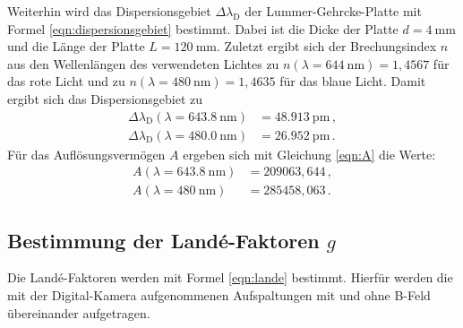 	Weiterhin wird das Dispersionsgebiet $\Delta \lambda_{\mathrm{D}}$ der
	Lummer-Gehrcke-Platte mit Formel
	\eqref{eqn:dispersionsgebiet} bestimmt. Dabei ist die Dicke der Platte $d=\SI{4}{\milli\meter}$
	und die Länge der Platte  $L = \SI{120}{\milli\meter}$. Zuletzt ergibt sich der
	Brechungsindex $n$ aus den Wellenlängen des verwendeten Lichtes zu
	$n(\lambda=\SI{644}{\nano\meter}) = 1,4567$ für das rote Licht und zu
	$n(\lambda=\SI{480}{\nano\meter}) = 1,4635$ für das blaue Licht. Damit ergibt sich
	das Dispersionsgebiet zu
	\begin{align*}
		\Delta \lambda_{\mathrm{D}}(\lambda=\SI{643.8}{\nano\meter}) &= \SI{48.913}{\pico\meter} \, \mathrm{,} \\
		\Delta \lambda_{\mathrm{D}}(\lambda=\SI{480.0}{\nano\meter}) &= \SI{26.952}{\pico\meter} \, \mathrm{.}
	\end{align*}
	Für das Auflösungsvermögen $A$ ergeben sich mit Gleichung \eqref{eqn:A} die Werte:
\begin{align*}
	A(\lambda=\SI{643.8}{\nano\meter}) &= 209063,644 \, \mathrm{,} \\
	A(\lambda=\SI{480}{\nano\meter}) &= 285458,063 \, \mathrm{.}
\end{align*}

\subsection{Bestimmung der Landé-Faktoren $g$}
	Die Landé-Faktoren werden mit Formel \eqref{eqn:lande} bestimmt. Hierfür werden die mit der
	Digital-Kamera aufgenommenen Aufspaltungen mit und ohne B-Feld übereinander aufgetragen.
